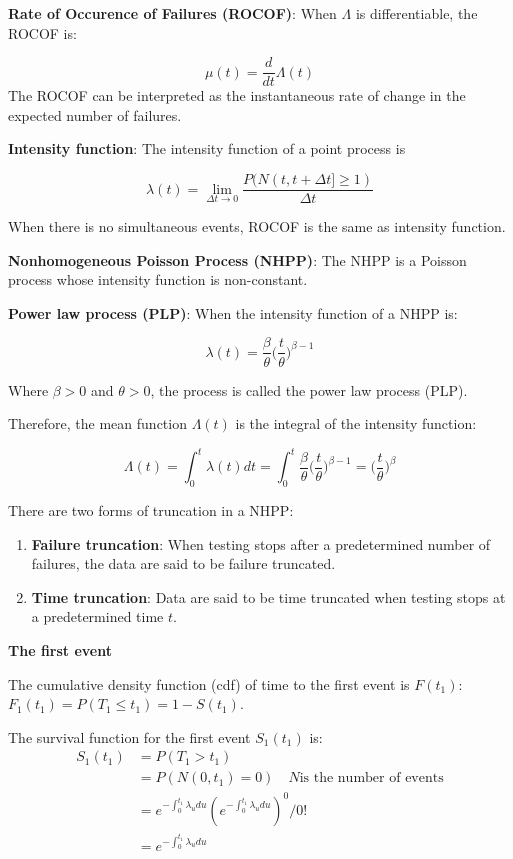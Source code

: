 \documentclass[12pt]{book}
\numberwithin{equation}{chapter}
\providecommand{\tightlist}{%
  \setlength{\itemsep}{0pt}\setlength{\parskip}{0pt}}
\begin{document}
\textbf{Rate of Occurence of Failures (ROCOF)}: When \(\Lambda\) is differentiable, the ROCOF is:

\[\mu(t) = \frac{d}{dt}\Lambda(t)\]
The ROCOF can be interpreted as the instantaneous rate of change in the expected number of failures.

\textbf{Intensity function}: The intensity function of a point process is

\[\lambda(t) = \lim_{\Delta t \rightarrow 0}\frac{P(N(t, t+\Delta t] \geq 1)}{\Delta t}\]

When there is no simultaneous events, ROCOF is the same as intensity function.

\textbf{Nonhomogeneous Poisson Process (NHPP)}: The NHPP is a Poisson process whose intensity function is non-constant.

\textbf{Power law process (PLP)}: When the intensity function of a NHPP is:

\[\lambda(t) = \frac{\beta}{\theta}\bigg(\frac{t}{\theta}\bigg)^{\beta-1}\]

Where \(\beta > 0\) and \(\theta > 0\), the process is called the power law process (PLP).

Therefore, the mean function \(\Lambda(t)\) is the integral of the intensity function:

\[\Lambda(t) = \int_0^t \lambda(t)dt = \int_0^t \frac{\beta}{\theta}\bigg(\frac{t}{\theta}\bigg)^{\beta-1} = \bigg(\frac{t}{\theta}\bigg)^{\beta}\]

There are two forms of truncation in a NHPP:

\begin{enumerate}
\def\labelenumi{\arabic{enumi}.}
\tightlist
\item
  \textbf{Failure truncation}: When testing stops after a predetermined number of failures, the data are said to be failure truncated.
\item
  \textbf{Time truncation}: Data are said to be time truncated when testing stops at a predetermined time \(t\).
\end{enumerate}

\textbf{The first event}

The cumulative density function (cdf) of time to the first event is \(F(t_1)\): \(F_1(t_1) = P(T_1 \leq t_1) = 1 - S(t_1)\).

The survival function for the first event \(S_1(t_1)\) is:
\begin{align*}
S_1(t_1) & = P(T_1 > t_1) \\
 & = P(N(0, t_1) = 0) \quad N \text{is the number of events}\\
 & = e^{-\int_{0}^{t_1}\lambda_{u}du}(e^{-\int_{0}^{t_1}\lambda_{u}du})^0/0!\\
 & = e^{-\int_{0}^{t_1}\lambda_{u}du}
\end{align*}
\end{document}
